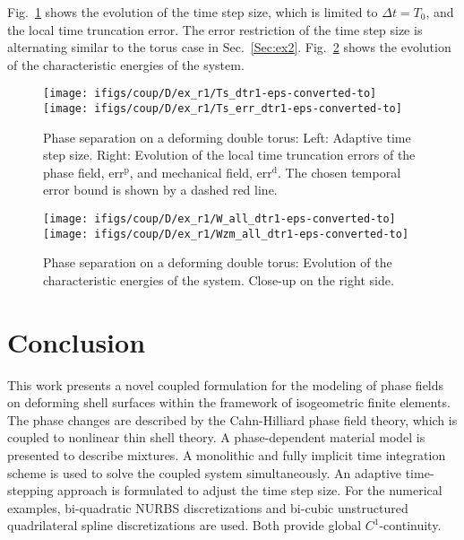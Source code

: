 \documentclass[11pt]{article}
\begin{document}
Fig.~\ref{fig:d_ts1} shows the evolution of the time step size, which is limited to $\Delta t= T_0$, and the local time truncation error. 
The error restriction of the time step size is alternating similar to the torus case in Sec.~\ref{Sec:ex2}.
Fig.~\ref{fig:d_ene1} shows the evolution of the characteristic energies of the system. 
\begin{figure}[H]
\centering
\texttt{[image: ifigs/coup/D/ex\_r1/Ts\_dtr1-eps-converted-to]}
\texttt{[image: ifigs/coup/D/ex\_r1/Ts\_err\_dtr1-eps-converted-to]}
\caption{Phase separation on a deforming double torus: Left: Adaptive time step size. Right: Evolution of the local time truncation errors of the phase field, $\mathrm{err}^\mathrm{p}$, and mechanical field, $\mathrm{err}^\mathrm{d}$. 
The chosen temporal error bound is shown by a dashed red line.}
\label{fig:d_ts1}
\end{figure}
\begin{figure}[H]
\centering
\texttt{[image: ifigs/coup/D/ex\_r1/W\_all\_dtr1-eps-converted-to]}
\texttt{[image: ifigs/coup/D/ex\_r1/Wzm\_all\_dtr1-eps-converted-to]}
\caption{Phase separation on a deforming double torus:  Evolution of the characteristic energies of the system. Close-up on the right side.}
\label{fig:d_ene1}
\end{figure}



\section{Conclusion}
\label{s:concl}

This work presents a novel coupled formulation for the modeling of phase fields on deforming shell surfaces within the framework of isogeometric finite elements. 
The phase changes are described by the Cahn-Hilliard phase field theory, which is coupled to nonlinear thin shell theory. 
A phase-dependent material model is presented to describe mixtures. 
A monolithic and fully implicit time integration scheme is used to solve the coupled system simultaneously. 
An adaptive time-stepping approach is formulated to adjust the time step size. 
For the numerical examples, bi-quadratic NURBS discretizations and bi-cubic unstructured quadrilateral spline discretizations are used. 
Both provide global $C^1$-continuity. 
\end{document}
